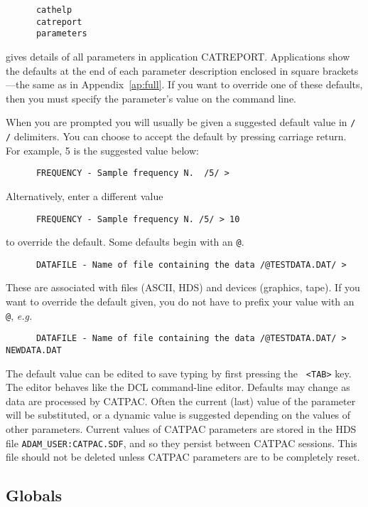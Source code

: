 \begin{verbatim}
      cathelp
      catreport
      parameters
\end{verbatim}

gives details of all parameters in application CATREPORT. Applications show the
defaults at the end of each  parameter description enclosed in square
brackets---the same as in Appendix~\ref{ap:full}. If you want to override one
of these defaults, then you must specify the parameter's value on the command
line.

When you are prompted you will usually be given a suggested default value in
{\tt / /} delimiters.  You can choose to accept the default by pressing
carriage return.  For example, 5 is the suggested value below:

\begin{verbatim}
      FREQUENCY - Sample frequency N.  /5/ >
\end{verbatim}
Alternatively, enter a different value
\begin{verbatim}
      FREQUENCY - Sample frequency N. /5/ > 10
\end{verbatim}
to override the default.
Some defaults begin with an {\tt @}.
\begin{verbatim}
      DATAFILE - Name of file containing the data /@TESTDATA.DAT/ >
\end{verbatim}

These are associated with files (ASCII, HDS) and devices (graphics,
tape). If you want to override the default given, you do not have to
prefix your value with an {\tt @}, {\it e.g.}

\begin{verbatim}
      DATAFILE - Name of file containing the data /@TESTDATA.DAT/ > NEWDATA.DAT
\end{verbatim}

The default value can be edited to save typing by first pressing the {\tt
<TAB>} key. The editor behaves like the {\small DCL} command-line editor.
Defaults may change as data are processed by {\small CATPAC}. Often the current
(last) value of the parameter will be substituted, or a dynamic value is
suggested depending on the values of other parameters.  Current values of
CATPAC parameters are stored in the HDS file {\tt ADAM\_USER:CATPAC.SDF}, and
so they persist between {\small CATPAC} sessions. This file should not be
deleted unless {\small CATPAC} parameters are to be completely reset.

\subsection{Globals}

